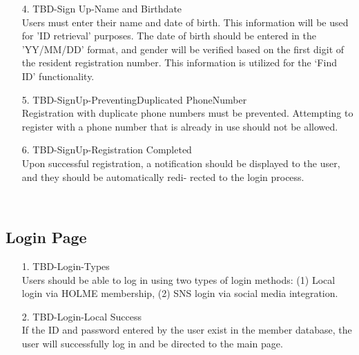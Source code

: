 \documentclass[conference]{IEEEtran}
\begin{document}
\begin{enumerate}
\begin{itemize}
\begin{itemize}
    \begin{enumerate}
        \item[4.] TBD-Sign Up-Name and Birthdate \\
        Users must enter their name and date of birth. This information will be used for ’ID retrieval’ purposes. The date of birth should be entered in the ’YY/MM/DD’ format, and gender will be verified based on the first digit of the resident registration number. This information is utilized for the ‘Find ID’ functionality. \\
    \end{enumerate}
    
    \begin{enumerate}
        \item[5.] TBD-Sign{\hspace{4pt}}Up-Preventing{\hspace{4pt}}Duplicated PhoneNumber \\
        Registration with duplicate phone numbers must be prevented. Attempting to register with a phone number that is already in use should not be allowed. \\
    \end{enumerate}

    \begin{enumerate}
        \item[6.] TBD-Sign{\hspace{4pt}}Up-Registration Completed \\
        Upon successful registration, a notification should be displayed to the user, and they should be automatically redi- rected to the login process. \\
    \end{enumerate}
\\

\subsection{Login Page}

    \begin{enumerate}
        \item[1.] TBD-Login-Types \\ 
        Users should be able to log in using two types of login methods: (1) Local login via HOLME membership, (2) SNS login via social media integration. \\
    \end{enumerate}
    
    \begin{enumerate}
        \item[2.] TBD-Login-Local Success \\
        If the ID and password entered by the user exist in the member database, the user will successfully log in and be directed to the main page. \\
    \end{enumerate}
    

\end{itemize}
\end{itemize}
\end{enumerate}
\end{document}
